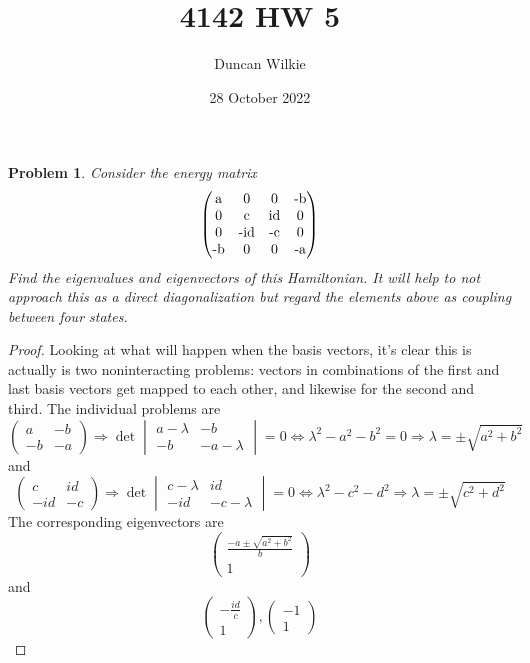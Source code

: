 \documentclass{article}
\title{4142 HW 5}
\author{Duncan Wilkie}
\date{28 October 2022}
\newtheorem{plm}{Problem}
\begin{document}
\maketitle

\begin{plm}
  Consider the energy matrix
  \[
    \begin{pmatrix}
      $a$ & 0 & 0 & $-b$ \\
      0 & $c$ & $id$ & 0 \\
      0 & $-id$ & $-c$ & 0 \\
      $-b$ & 0 & 0 &  $-a$
    \end{pmatrix}
  \]
  Find the eigenvalues and eigenvectors of this Hamiltonian.
  It will help to not approach this as a direct diagonalization but regard the elements above as coupling between four states.
\end{plm}

\begin{proof}
  Looking at what will happen when the basis vectors, it's clear this is actually is two noninteracting problems:
  vectors in combinations of the first and last basis vectors get mapped to each other, and likewise for the second and third.
  The individual problems are
  \[
    \begin{pmatrix}
      a & -b \\
      -b & -a
    \end{pmatrix}
    \Rightarrow \det
    \begin{vmatrix}
      a - \lambda & -b \\
      -b & -a - \lambda
    \end{vmatrix} = 0
    \Leftrightarrow \lambda^{2} - a^{2} - b^{2} = 0 \Rightarrow \lambda = \pm \sqrt{a^{2} + b^{2}}
  \]
  and
  \[
    \begin{pmatrix}
      c & id \\
      -id & -c
    \end{pmatrix}
    \Rightarrow \det
    \begin{vmatrix}
      c - \lambda & id \\
      -id & -c - \lambda
    \end{vmatrix}
    = 0
    \Leftrightarrow \lambda^{2} - c^{2} - d^{2} \Rightarrow \lambda = \pm \sqrt{c^{2} + d^{2}}
  \]
  The corresponding eigenvectors are
  \[
    \begin{pmatrix}
      \frac{-a \pm \sqrt{a^{2} + b^{2}}}{b} \\
      1
    \end{pmatrix}
  \]
  and
  \[
    \begin{pmatrix}
      -\frac{id}{c} \\
      1
    \end{pmatrix},
    \begin{pmatrix}
      -1 \\
      1
    \end{pmatrix}
  \]
\end{proof}
\end{document}
